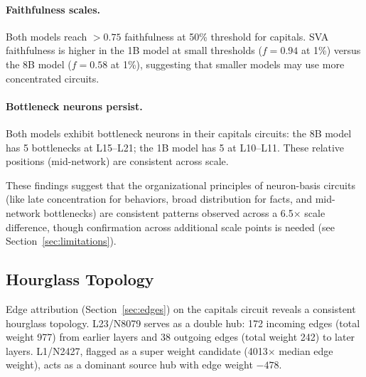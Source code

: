 \documentclass[11pt]{article}
\begin{document}
\paragraph{Faithfulness scales.}
Both models reach $> 0.75$ faithfulness at 50\% threshold for capitals.
SVA faithfulness is higher in the 1B model at small thresholds ($f{=}0.94$ at 1\%) versus the 8B model ($f{=}0.58$ at 1\%), suggesting that smaller models may use more concentrated circuits.

\paragraph{Bottleneck neurons persist.}
Both models exhibit bottleneck neurons in their capitals circuits: the 8B model has 5 bottlenecks at L15--L21; the 1B model has 5 at L10--L11.
These relative positions (mid-network) are consistent across scale.

These findings suggest that the organizational principles of neuron-basis circuits (like late concentration for behaviors, broad distribution for facts, and mid-network bottlenecks) are consistent patterns observed across a 6.5$\times$ scale difference, though confirmation across additional scale points is needed (see Section~\ref{sec:limitations}).


\subsection{Hourglass Topology}
\label{sec:hourglass}

Edge attribution (Section~\ref{sec:edges}) on the capitals circuit reveals a consistent hourglass topology.
L23/N8079 serves as a double hub: 172 incoming edges (total weight 977) from earlier layers and 38 outgoing edges (total weight 242) to later layers.
L1/N2427, flagged as a super weight candidate \citep{yu2024superweights} (4013$\times$ median edge weight), acts as a dominant source hub with edge weight $-478$.
\end{document}
